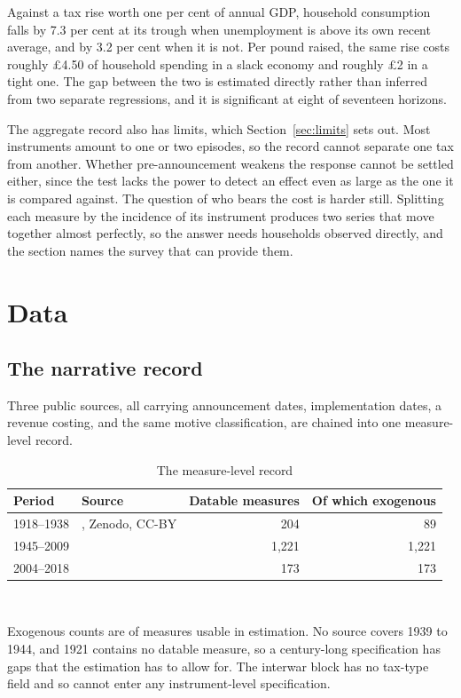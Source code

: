 \documentclass[11pt,a4paper]{article}
\begin{document}
Against a tax rise worth one per cent of annual GDP, household consumption falls by 7.3 per cent at
its trough when unemployment is above its own recent average, and by 3.2 per cent when it is not.
Per pound raised, the same rise costs roughly \pounds 4.50 of household spending in a slack economy
and roughly \pounds 2 in a tight one. The gap between the two is estimated directly rather than
inferred from two separate regressions, and it is significant at eight of seventeen horizons.

The aggregate record also has limits, which Section~\ref{sec:limits} sets out. Most instruments
amount to one or two episodes, so the record cannot separate one tax from another. Whether
pre-announcement weakens the response cannot be settled either, since the test lacks the power to
detect an effect even as large as the one it is compared against. The question of who bears the cost is harder still. Splitting each measure by the incidence of its instrument produces two series that
move together almost perfectly, so the answer needs households observed directly, and the section
names the survey that can provide them.

\section{Data}\label{sec:data}

\subsection{The narrative record}

Three public sources, all carrying announcement dates, implementation dates, a revenue costing, and
the same motive classification, are chained into one measure-level record.

\begin{table}[htbp]
\centering
\caption{The measure-level record}
\label{tab:sources}
\begin{tabular}{llrr}
\toprule
Period & Source & Datable measures & Of which exogenous \\
\midrule
1918--1938 & \citet{cloyne2023}, Zenodo, CC-BY & 204 & 89 \\
1945--2009 & \citet{cloyne2013} & 1,221 & 1,221 \\
2004--2018 & \citet{conway2021} & 173 & 173 \\
\bottomrule
\end{tabular}
\\[4pt]
\begin{minipage}{0.86\textwidth}
\footnotesize Exogenous counts are of measures usable in estimation. No source covers 1939 to 1944,
and 1921 contains no datable measure, so a century-long specification has gaps that the estimation
has to allow for. The interwar block has no tax-type field and so cannot enter any instrument-level
specification.
\end{minipage}
\end{table}
\end{document}

